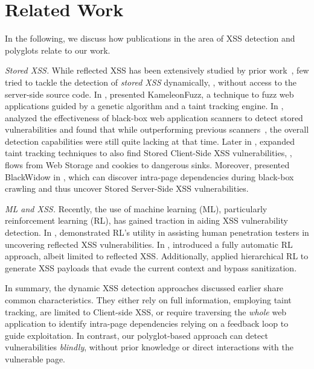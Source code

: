 \section{Related Work}
\label{sec:related-work}%
In the following, we discuss how publications in the area of XSS detection and polyglots relate to our work.

\smallskip\textit{Stored XSS.}
While reflected XSS has been extensively studied by prior work~\cite[\eg][]{LekStoJoh13, StoPfiKaiLek+15, stock2017web, MelDasShaBau+18, BenKleBarJoh21, KleBarBen+22, son2013postman, steffens2020pmforce}, few tried to tackle the detection of \emph{stored XSS} dynamically, \ie, without access to the server-side source code.
In \citeyear{duchene2014kameleonfuzz}, \citet{duchene2014kameleonfuzz} presented KameleonFuzz, a technique to fuzz web applications guided by a genetic algorithm and a taint tracking engine.
In \citeyear{parvez2015analysis}, \citet{parvez2015analysis} analyzed the effectiveness of black-box web application scanners to detect stored vulnerabilities and found that while outperforming previous scanners~\cite{doupe2010johnny, bau2010state}, the overall detection capabilities were still quite lacking at that time.
Later in \citeyear{SteRosJohSto+19}, \citet{SteRosJohSto+19} expanded taint tracking techniques to also find Stored Client-Side XSS vulnerabilities, \ie, flows from Web Storage and cookies to dangerous sinks.
Moreover, \citet{eriksson2021black} presented BlackWidow in \citeyear{eriksson2021black}, which can discover intra-page dependencies during black-box crawling and thus uncover Stored Server-Side XSS vulnerabilities.

\textit{ML and XSS\@.}
Recently, the use of machine learning (ML), particularly reinforcement learning (RL), has gained traction in aiding XSS vulnerability detection.
In \citeyear{caturano2021discovering}, \citet{caturano2021discovering} demonstrated RL's utility in assisting human penetration testers in uncovering reflected XSS vulnerabilities. 
In \citeyear{lee2022link}, \citet{lee2022link} introduced a fully automatic RL approach, albeit limited to reflected XSS\@. 
Additionally, \citet{foley2022haxss} applied hierarchical RL to generate XSS payloads that evade the current context and bypass sanitization.


In summary, the dynamic XSS detection approaches discussed earlier share common characteristics.
They either rely on full information, employing taint tracking, are limited to Client-side XSS, or require traversing the \emph{whole} web application to identify intra-page dependencies relying on a feedback loop to guide exploitation.
In contrast, our polyglot-based approach can detect vulnerabilities \emph{blindly}, without prior knowledge or direct interactions with the vulnerable page.

